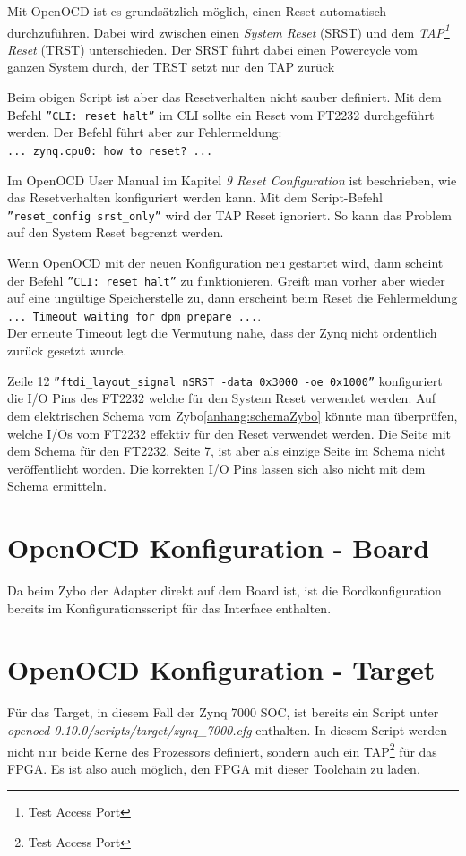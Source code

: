Mit OpenOCD ist es grundsätzlich möglich, einen Reset automatisch durchzuführen.
Dabei wird zwischen einen \textit{System Reset} (SRST) und dem \textit{TAP\footnote{Test Access Port} Reset} (TRST) unterschieden.
Der SRST führt dabei einen Powercycle vom ganzen System durch, der TRST setzt nur den TAP zurück

Beim obigen Script ist aber das Resetverhalten nicht sauber definiert.
Mit dem Befehl \texttt{''CLI: reset halt''} im CLI sollte ein Reset vom FT2232 durchgeführt werden.
Der Befehl führt aber zur Fehlermeldung:\\
\texttt{... zynq.cpu0: how to reset? ...}

Im OpenOCD User Manual\cite{bib:OpenOCDDoku} im Kapitel \textit{9 Reset Configuration} ist beschrieben, wie das Resetverhalten konfiguriert werden kann.
Mit dem Script-Befehl \texttt{''reset\_config srst\_only''} wird der TAP Reset ignoriert.
So kann das Problem auf den System Reset begrenzt werden.

Wenn OpenOCD mit der neuen Konfiguration neu gestartet wird, dann scheint der Befehl \texttt{''CLI: reset halt''} zu funktionieren.
Greift man vorher aber wieder auf eine ungültige Speicherstelle zu, dann erscheint beim Reset die Fehlermeldung\\
\texttt{... Timeout waiting for dpm prepare ...}.\\
Der erneute Timeout legt die Vermutung nahe, dass der Zynq nicht ordentlich zurück gesetzt wurde.

Zeile 12 \texttt{''ftdi\_layout\_signal nSRST -data 0x3000 -oe 0x1000''} konfiguriert die I/O Pins des FT2232 welche für den System Reset verwendet werden.
Auf dem elektrischen Schema vom Zybo\ref{anhang:schemaZybo} könnte man überprüfen, welche I/Os vom FT2232 effektiv für den Reset verwendet werden.
Die Seite mit dem Schema für den FT2232, Seite 7, ist aber als einzige Seite im Schema nicht veröffentlicht worden.
Die korrekten I/O Pins lassen sich also nicht mit dem Schema ermitteln.



% 




\section{OpenOCD Konfiguration - Board}
Da beim Zybo der Adapter direkt auf dem Board ist, ist die Bordkonfiguration bereits im Konfigurationsscript für das Interface enthalten.

\section{OpenOCD Konfiguration - Target}
Für das Target, in diesem Fall der Zynq 7000 SOC, ist bereits ein Script unter \textit{openocd-0.10.0/scripts/target/zynq\_7000.cfg} enthalten.
In diesem Script werden nicht nur beide Kerne des Prozessors definiert, sondern auch ein TAP\footnote{Test Access Port} für das FPGA.
Es ist also auch möglich, den FPGA mit dieser Toolchain zu laden.
